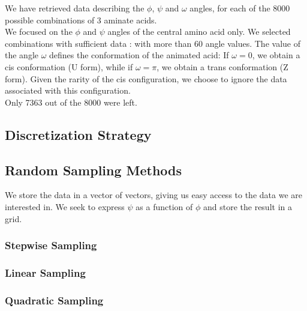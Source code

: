 \documentclass{article}
\begin{document}

We have retrieved data describing the $\phi$, $\psi$ and $\omega$ angles, for each of the 8000 possible combinations of 3 aminate acids. \\
We focused on the $\phi$ and $\psi$ angles of the central amino acid only. We selected combinations with sufficient data : with more than 60 angle values. 
The value of the angle $\omega$ defines the conformation of the animated acid: If $\omega=0$, we obtain a cis conformation (U form), while if $\omega=\pi$, we obtain a trans conformation (Z form). Given the rarity of the cis configuration, we choose to ignore the data associated with this configuration. \\
Only 7363 out of the 8000 were left. 



\subsection{Discretization Strategy}

\subsection{Random Sampling Methods}

We store the data in a vector of vectors, giving us easy access to the data we are interested in. We seek to express $\psi$ as a function of $\phi$ and store the result in a grid. 


\subsubsection{Stepwise Sampling}
\subsubsection{Linear Sampling}
\subsubsection{Quadratic Sampling}
\end{document}
